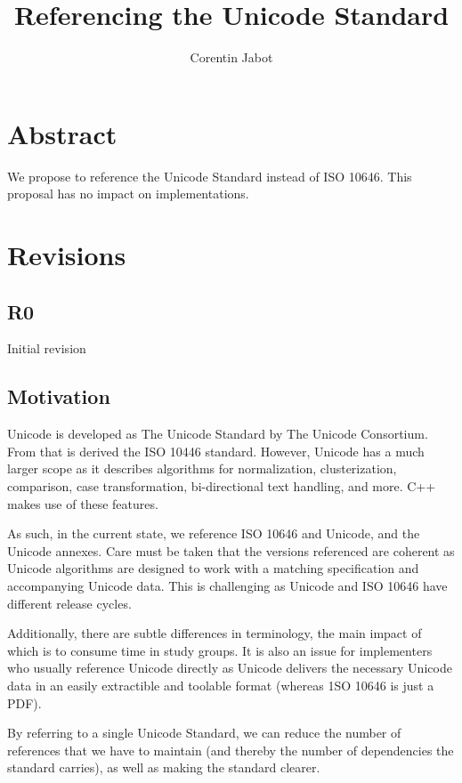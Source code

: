 \documentclass{wg21}
\title{Referencing the Unicode Standard}
\author{Corentin Jabot}{corentin.jabot@gmail.com}
\begin{document}
\maketitle

\section{Abstract}

We propose to reference the Unicode Standard instead of ISO 10646.
This proposal has no impact on implementations.

\section{Revisions}

\subsection{R0}

Initial revision

\subsection{Motivation}

Unicode is developed as The Unicode Standard by The Unicode Consortium.
From that is derived the ISO 10446 standard.
However, Unicode has a much larger scope as it describes algorithms for normalization,
clusterization, comparison, case transformation, bi-directional text handling, and more.
C++ makes use of these features.

As such, in the current state, we reference ISO 10646 and Unicode, and the Unicode annexes.
Care must be taken that the versions referenced are coherent as Unicode algorithms
are designed to work with a matching specification and accompanying Unicode data.
This is challenging as Unicode and ISO 10646 have different release cycles.

Additionally, there are subtle differences in terminology, the main impact of which
is to consume time in study groups.
It is also an issue for implementers who usually reference
Unicode directly as Unicode delivers the necessary Unicode data in an easily extractible
and toolable format (whereas 1SO 10646 is just a PDF).

By referring to a single Unicode Standard, we can reduce the number of references
that we have to maintain (and thereby the number of dependencies the standard carries),
as well as making the standard clearer.
\end{document}
